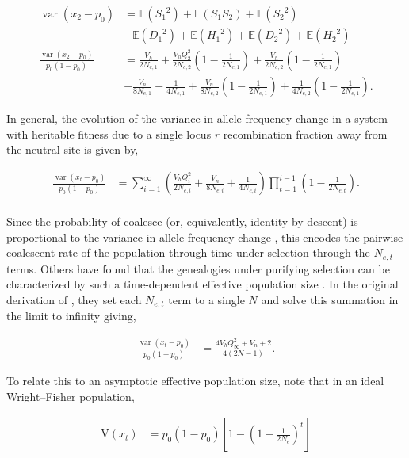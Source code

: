 \documentclass[11pt]{article}
\newcommand{\E}{\mathbb{E}}
\newcommand{\V}{\text{V}}
\DeclareMathOperator{\var}{var}
\begin{document}
\begin{align}
    \label{eq:vardecay}
  \var(x_2 - p_0) &= \E({S_1}^2) + \E(S_1 S_2) + \E({S_2}^2) \\
                  & + \E({D_1}^2) + \E({H_1}^2) + \E({D_2}^2) + \E({H_2}^2) \\
  \frac{\var(x_2 - p_0)}{p_0(1-p_0)} &= \frac{V_h}{2N_{e,1}} + \frac{V_h Q_2^2}{2N_{e,2}}\left(1-\frac{1}{2N_{e,1}}\right)  +  \frac{V_h}{2N_{e,2}}  \left(1-\frac{1}{2N_{e,1}}\right)  \\ 
                                     &+ \frac{V_n}{8N_{e,1}} + \frac{1}{4N_{e,1}} + \frac{V_n}{8N_{e,2}}  \left(1 - \frac{1}{2N_{e,1}}\right) 
+ \frac{1}{4N_{e,2}} \left(1 - \frac{1}{2N_{e,1}}\right).
\end{align}

In general, the evolution of the variance in allele frequency change in a
system with heritable fitness due to a single locus $r$ recombination fraction
away from the neutral site is given by,

\begin{align}
  \label{eqn:var_xt}
  \frac{\var(x_t - p_0)}{p_0(1-p_0)} &= \sum_{i=1}^\infty \left(\frac{V_h Q_i^2}{2 N_{e,i}} + \frac{V_n}{8N_{e,i}} + \frac{1}{4N_{e,i}} \right)\prod_{t=1}^{i-1} \left(1-\frac{1}{2 N_{e,t}}\right). \\
\end{align}

Since the probability of coalesce (or, equivalently, identity by descent) is
proportional to the variance in allele frequency change
\parencite{Barton2000-zg}, this encodes the pairwise coalescent rate of the
population through time under selection through the $N_{e,t}$ terms. Others
have found that the genealogies under purifying selection can be characterized
by such a time-dependent effective population size
\parencite{Nicolaisen2013-gv}. In the original derivation of
\textcite{Santiago1995-hx}, they set each $N_{e,t}$ term to a single $N$ and
solve this summation in the limit to infinity giving,

\begin{align}
  \label{eq:var_asymp}
  \frac{\var(x_t - p_0)}{p_0(1-p_0)} &= \frac{4 V_h Q_\infty^2 +V_n+2}{4 (2 N-1)}.
\end{align}

To relate this to an asymptotic effective population size, note that in an
ideal Wright--Fisher population,

\begin{align}
  \V(x_t) &= p_0(1-p_0) \left[1 - \left(1 - \frac{1}{2N_e}\right)^t \right]
\end{align}
\end{document}
